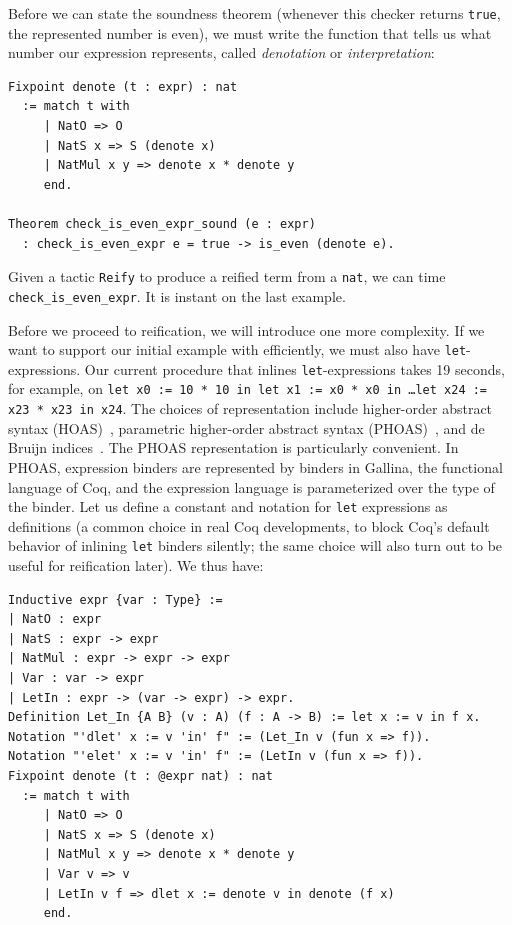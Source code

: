Before we can state the soundness theorem (whenever this checker returns \texttt{true}, the represented number is even), we must write the function that tells us what number our expression represents, called \emph{denotation} or \emph{interpretation}:
\begin{verbatim}
Fixpoint denote (t : expr) : nat
  := match t with
     | NatO => O
     | NatS x => S (denote x)
     | NatMul x y => denote x * denote y
     end.

Theorem check_is_even_expr_sound (e : expr)
  : check_is_even_expr e = true -> is_even (denote e).
\end{verbatim}

Given a tactic \texttt{Reify} to produce a reified term from a \verb|nat|, we can time \verb|check_is_even_expr|.
It is instant on the last example.%

Before we proceed to reification, we will introduce one more complexity.
If we want to support our initial example with \space efficiently, we must also have \texttt{let}-expressions.
Our current procedure that inlines \texttt{let}-expressions takes 19 seconds, for example, on \texttt{let x0 := 10 * 10 in let x1 := x0 * x0 in \ldots\space let x24 := x23 * x23 in x24}.
The choices of representation include higher-order abstract syntax (HOAS)~\cite{HOAS}, parametric higher-order abstract syntax (PHOAS)~\cite{PhoasICFP08}, and de Bruijn indices~\cite{DeBruijn}.
The PHOAS representation is particularly convenient.
In PHOAS, expression binders are represented by binders in Gallina, the functional language of Coq, and the expression language is parameterized over the type of the binder.
Let us define a constant and notation for \texttt{let} expressions as definitions (a common choice in real Coq developments, to block Coq's default behavior of inlining \texttt{let} binders silently; the same choice will also turn out to be useful for reification later).
We thus have: \label{sec:phoas-expr-def}
\begin{verbatim}
Inductive expr {var : Type} :=
| NatO : expr
| NatS : expr -> expr
| NatMul : expr -> expr -> expr
| Var : var -> expr
| LetIn : expr -> (var -> expr) -> expr.
Definition Let_In {A B} (v : A) (f : A -> B) := let x := v in f x.
Notation "'dlet' x := v 'in' f" := (Let_In v (fun x => f)).
Notation "'elet' x := v 'in' f" := (LetIn v (fun x => f)).
Fixpoint denote (t : @expr nat) : nat
  := match t with
     | NatO => O
     | NatS x => S (denote x)
     | NatMul x y => denote x * denote y
     | Var v => v
     | LetIn v f => dlet x := denote v in denote (f x)
     end.
\end{verbatim}

